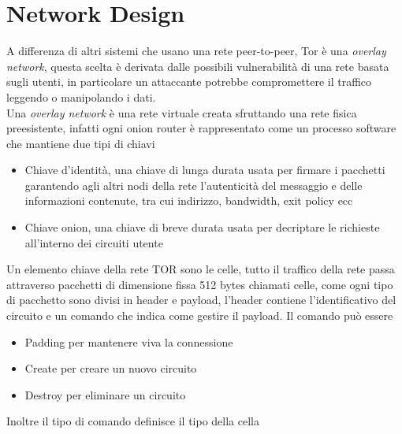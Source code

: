 \section{Network Design}
A differenza di altri sistemi che usano una rete peer-to-peer, Tor è una \emph{overlay network}, questa scelta è derivata dalle possibili vulnerabilità di una rete basata sugli utenti, in particolare un attaccante potrebbe compromettere il traffico leggendo o manipolando i dati. \\
Una \emph{overlay network} è una rete virtuale creata sfruttando una rete fisica preesistente, infatti ogni onion router è rappresentato come un processo software che mantiene due tipi di chiavi \\
\begin{itemize}
    \item Chiave d'identità, una chiave di lunga durata usata per firmare i pacchetti garantendo agli altri nodi della rete l'autenticità del messaggio e delle informazioni contenute, tra cui indirizzo, bandwidth, exit policy ecc
    \item Chiave onion, una chiave di breve durata usata per decriptare le richieste all'interno dei circuiti utente
\end{itemize}
\par
Un elemento chiave della rete TOR sono le celle, tutto il traffico della rete passa attraverso pacchetti di dimensione fissa 512 bytes chiamati celle, come ogni tipo di pacchetto sono divisi in header e payload, l'header contiene l'identificativo del circuito e un comando che indica come gestire il payload. Il comando può essere \\
\begin{itemize}
    \item Padding per mantenere viva la connessione
    \item Create per creare un nuovo circuito
    \item Destroy per eliminare un circuito
\end{itemize}
Inoltre il tipo di comando definisce il tipo della cella
